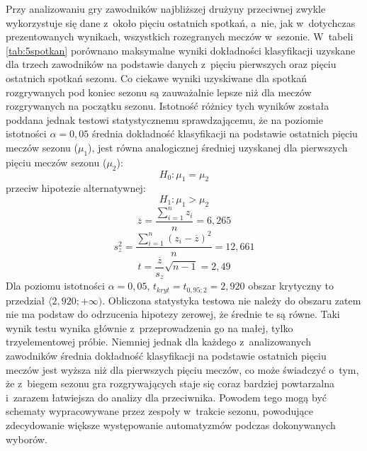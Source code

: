 \documentclass[a4paper,twoside,12pt]{book}
\begin{document}
Przy analizowaniu gry zawodników najbliższej drużyny przeciwnej zwykle wykorzystuje się dane z~około pięciu ostatnich spotkań, a~nie, jak w~dotychczas prezentowanych wynikach, wszystkich rozegranych meczów w~sezonie. W~tabeli \ref{tab:5spotkan} porównano maksymalne wyniki dokładności klasyfikacji uzyskane dla trzech zawodników na podstawie danych z~pięciu pierwszych oraz pięciu ostatnich spotkań sezonu. Co ciekawe wyniki uzyskiwane dla spotkań rozgrywanych pod koniec sezonu są zauważalnie lepsze niż dla meczów rozgrywanych na początku sezonu. Istotność różnicy tych wyników została poddana jednak testowi statystycznemu sprawdzającemu, że na poziomie istotności $\alpha = 0{,}05$ średnia dokładność klasyfikacji na podstawie ostatnich pięciu meczów sezonu ($\mu_1$), jest równa analogicznej średniej uzyskanej dla pierwszych pięciu meczów sezonu ($\mu_2$):
\begin{equation}
H_{0}:\mu_1=\mu_2
\end{equation}
przeciw hipotezie alternatywnej:
\begin{equation}
H_{1}:\mu_1>\mu_2
\end{equation}
\begin{equation}
\overline{z} = \frac{\sum_{i=1}^{n}z_{i}}{n}=6{,}265
\end{equation}
\begin{equation}
s_{z}^{2}=\frac{\sum_{i=1}^{n}(z_{i}-\overline{z})^{2}}{n}=12{,}661
\end{equation}
\begin{equation}
t =\frac{\overline{z}}{s_z}\sqrt{n-1}=2{,}49
\end{equation}
Dla poziomu istotności $\alpha=0{,}05$, $t_{kryt}=t_{0{,}95;2}=2{,}920$ obszar krytyczny to przedział $\langle 2{,}920;+\infty)$. Obliczona statystyka testowa nie należy do obszaru zatem nie ma podstaw do odrzucenia hipotezy zerowej, że średnie te są równe. Taki wynik testu wynika głównie z~przeprowadzenia go na małej, tylko trzyelementowej próbie. Niemniej jednak dla każdego z~analizowanych zawodników średnia dokładność klasyfikacji na podstawie ostatnich pięciu meczów jest wyższa niż dla pierwszych pięciu meczów, co może świadczyć o~tym, że z~biegem sezonu gra rozgrywających staje się coraz bardziej powtarzalna i~zarazem łatwiejsza do analizy dla przeciwnika. Powodem tego mogą być schematy wypracowywane przez zespoły w~trakcie sezonu, powodujące zdecydowanie większe występowanie automatyzmów podczas dokonywanych wyborów.
\end{document}
